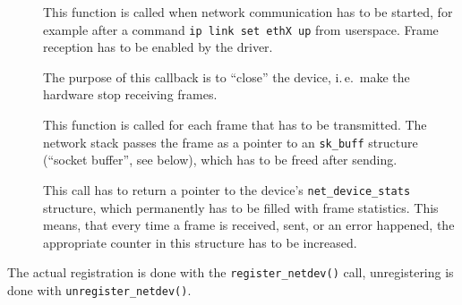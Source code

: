 \documentclass[a4paper,12pt,BCOR6mm,bibtotoc,idxtotoc]{scrbook}
\begin{document}
\newsavebox\boxopen
\sbox{}
\newsavebox\boxstop
\sbox{}
\newsavebox\boxxmit
\sbox{}
\newsavebox\boxstats
\sbox{}

\begin{description}

\item[\usebox\boxopen] This function is called when network communication has
to be started, for example after a command \lstinline+ip link set ethX up+
from userspace. Frame reception has to be enabled by the driver.

\item[\usebox\boxstop] The purpose of this callback is to ``close'' the
device, i.\,e.\ make the hardware stop receiving frames.

\item[\usebox\boxxmit] This function is called for each frame that has to be
transmitted. The network stack passes the frame as a pointer to an
\lstinline+sk_buff+ structure (``socket buffer'', see
below), which has to be freed after sending.

\item[\usebox\boxstats] This call has to return a pointer to the device's
\lstinline+net_device_stats+ structure, which permanently has to be filled with
frame statistics. This means, that every time a frame is received, sent, or an
error happened, the appropriate counter in this structure has to be increased.

\end{description}

The actual registration is done with the \lstinline+register_netdev()+ call,
unregistering is done with \lstinline+unregister_netdev()+.
\end{document}
